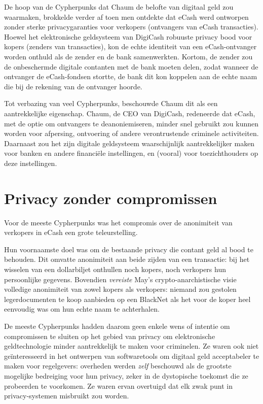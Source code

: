 \documentclass[smalldemyvopaper,11pt,twoside,onecolumn,openright,extrafontsizes,hidelinks]{memoir}
\begin{document}
De hoop van de Cypherpunks dat Chaum de belofte van digitaal geld zou
waarmaken, brokkelde verder af toen men ontdekte dat eCash werd
ontworpen zonder sterke privacygaranties voor verkopers (ontvangers van
eCash transacties). Hoewel het elektronische geldsysteem van DigiCash
robuuste privacy bood voor kopers (zenders van transacties), kon de
echte identiteit van een eCash-ontvanger worden onthuld als de zender en
de bank samenwerkten. Kortom, de zender zou de onbeschermde digitale
contanten met de bank moeten delen, zodat wanneer de ontvanger de
eCash-fondsen stortte, de bank dit kon koppelen aan de echte naam die
bij de rekening van de ontvanger hoorde.

Tot verbazing van veel Cypherpunks, beschouwde Chaum dit als een
aantrekkelijke eigenschap. Chaum, de CEO van DigiCash, redeneerde dat
eCash, met de optie om ontvangers te deanoniemiseren, minder snel
gebruikt zou kunnen worden voor afpersing, ontvoering of andere
verontrustende criminele activiteiten. Daarnaast zou het zijn digitale
geldsysteem waarschijnlijk aantrekkelijker maken voor banken en andere
financiële instellingen, en (vooral) voor toezichthouders op deze
instellingen.

\section{Privacy zonder compromissen}\label{privacy-zonder-compromissen}

Voor de meeste Cypherpunks was het compromis over de anonimiteit van
verkopers in eCash een grote teleurstelling.

Hun voornaamste doel was om de bestaande privacy die contant geld al
bood te behouden. Dit omvatte anonimiteit aan beide zijden van een
transactie: bij het wisselen van een dollarbiljet onthullen noch kopers,
noch verkopers hun persoonlijke gegevens. Bovendien \emph{vereiste}
May's crypto-anarchistische visie volledige anonimiteit van zowel kopers
als verkopers: niemand zou gestolen legerdocumenten te koop aanbieden op
een BlackNet als het voor de koper heel eenvoudig was om hun echte naam
te achterhalen.

De meeste Cypherpunks hadden daarom geen enkele wens of intentie om
compromissen te sluiten op het gebied van privacy om elektronische
geldtechnologie minder aantrekkelijk te maken voor criminelen. Ze waren
ook niet geïnteresseerd in het ontwerpen van softwaretools om digitaal
geld acceptabeler te maken voor regelgevers: overheden werden
\emph{zelf} beschouwd als de grootste mogelijke bedreiging voor hun
privacy, zeker in de dystopische toekomst die ze probeerden te
voorkomen. Ze waren ervan overtuigd dat elk zwak punt in
privacy-systemen misbruikt zou worden.
\end{document}
